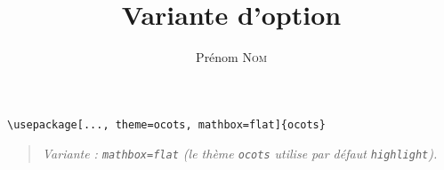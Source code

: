 \documentclass[11pt]{ocots-book}
\title{Variante d'option}
\author{Prénom \textsc{Nom}}
\newcommand{\ocotsvariantnote}[1]{\begin{quote}\itshape Variante : #1\end{quote}}
\begin{document}
\maketitle

\begin{lstlisting}
\usepackage[..., theme=ocots, mathbox=flat]{ocots}
\end{lstlisting}
\ocotsvariantnote{\texttt{mathbox=flat} (le th\`eme \texttt{ocots} utilise par d\'efaut \texttt{highlight}).}

\end{document}
